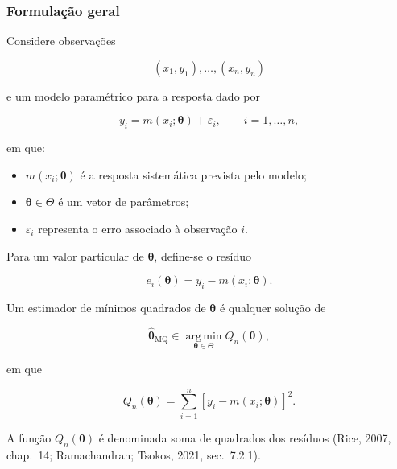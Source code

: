 \documentclass[
  letterpaper,
  DIV=11,
  numbers=noendperiod]{scrreprt}
\providecommand{\tightlist}{%
  \setlength{\itemsep}{0pt}\setlength{\parskip}{0pt}}\usepackage{longtable,booktabs,array}
\begin{document}
\subsubsection{Formulação geral}\label{formulauxe7uxe3o-geral}

Considere observações

\[(x_1,y_1),\ldots,(x_n,y_n)\]

e um modelo paramétrico para a resposta dado por

\[y_i
=
m(x_i;\boldsymbol\theta)
+
\varepsilon_i,
\qquad i=1,\ldots,n,\]

em que:

\begin{itemize}
\tightlist
\item
  \(m(x_i;\boldsymbol\theta)\) é a resposta sistemática prevista pelo
  modelo;
\item
  \(\boldsymbol\theta\in\Theta\) é um vetor de parâmetros;
\item
  \(\varepsilon_i\) representa o erro associado à observação \(i\).
\end{itemize}

Para um valor particular de \(\boldsymbol\theta\), define-se o resíduo

\[e_i(\boldsymbol\theta)
=
y_i-m(x_i;\boldsymbol\theta).\]

\begin{tcolorbox}[enhanced jigsaw, colback=white, leftrule=.75mm, colbacktitle=quarto-callout-important-color!10!white, breakable, titlerule=0mm, bottomtitle=1mm, title=\textcolor{quarto-callout-important-color}{\faExclamation}\hspace{0.5em}{Definição: estimador de mínimos quadrados}, colframe=quarto-callout-important-color-frame, toprule=.15mm, opacityback=0, bottomrule=.15mm, opacitybacktitle=0.6, arc=.35mm, toptitle=1mm, rightrule=.15mm, coltitle=black, left=2mm]

Um estimador de mínimos quadrados de \(\boldsymbol\theta\) é qualquer
solução de

\[\widehat{\boldsymbol\theta}_{\mathrm{MQ}}
\in
\operatorname*{arg\,min}_{\boldsymbol\theta\in\Theta}
Q_n(\boldsymbol\theta),\]

em que

\[Q_n(\boldsymbol\theta)
=
\sum_{i=1}^n
\left[
y_i-m(x_i;\boldsymbol\theta)
\right]^2.\]

A função \(Q_n(\boldsymbol\theta)\) é denominada soma de quadrados dos
resíduos (Rice, 2007, chap.~14; Ramachandran; Tsokos, 2021, sec.~7.2.1).

\end{tcolorbox}
\end{document}
